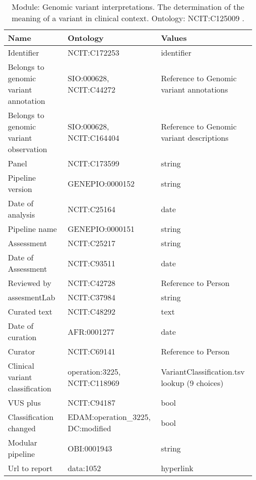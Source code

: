 \documentclass{article}
\begin{document}
\begin{table}[htb]
\begin{tabular}{lll}
Name & Ontology & Values \\
\hline
Identifier & NCIT:C172253  & identifier \\
Belongs to genomic variant annotation & SIO:000628, NCIT:C44272  & Reference to Genomic variant annotations \\
Belongs to genomic variant observation & SIO:000628, NCIT:C164404  & Reference to Genomic variant descriptions \\
Panel & NCIT:C173599  & string \\
Pipeline version & GENEPIO:0000152  & string \\
Date of analysis & NCIT:C25164  & date \\
Pipeline name & GENEPIO:0000151  & string \\
Assessment & NCIT:C25217  & string \\
Date of Assessment & NCIT:C93511  & date \\
Reviewed by & NCIT:C42728  & Reference to Person \\
assesmentLab & NCIT:C37984  & string \\
Curated text & NCIT:C48292  & text \\
Date of curation & AFR:0001277  & date \\
Curator & NCIT:C69141  & Reference to Person \\
Clinical variant classification & operation:3225, NCIT:C118969  & VariantClassification.tsv lookup (9 choices) \\
VUS plus & NCIT:C94187  & bool \\
Classification changed & EDAM:operation\_3225, DC:modified  & bool \\
Modular pipeline & OBI:0001943  & string \\
Url to report & data:1052  & hyperlink \\
\hline
\end{tabular}
\caption[Module: Genomic variant interpretations]{\label{table:table23} Module: Genomic variant interpretations. The determination of the meaning of a variant in clinical context. Ontology: NCIT:C125009 . }
\end{table}
\end{document}
